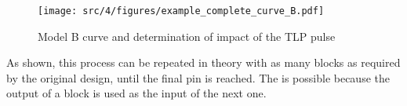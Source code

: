 \begin{figure}[!h]
  \centering
  \texttt{[image: src/4/figures/example\_complete\_curve\_B.pdf]}
  \caption{Model B curve and determination of impact of the TLP pulse}
  \label{example_complete_curve_B}
\end{figure}

As shown, this process can be repeated in theory with as many blocks as required by the original design, until the final pin is reached.
The is possible because the output of a block is used as the input of the next one.




